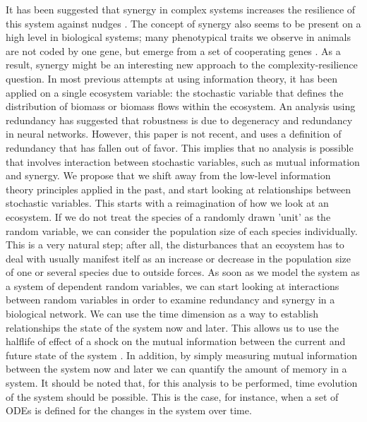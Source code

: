 \documentclass[../main.tex]{subfiles}
\begin{document}
It has been suggested that synergy in complex systems increases the resilience of this system against nudges \cite{quax2017quantifying}.
The concept of synergy also seems to be present on a high level in biological systems; many phenotypical traits we observe in animals are not coded by one gene, but emerge from a set of cooperating genes \cite{griffith2014quantifying}.
As a result, synergy might be an interesting new approach to the complexity-resilience question.
In most previous attempts at using information theory, it has been applied on a single ecosystem variable: the stochastic variable that defines the distribution of biomass or biomass flows within the ecosystem.
An analysis using redundancy has suggested that robustness is due to degeneracy and redundancy in neural networks.
However, this paper is not recent, and uses a definition of redundancy that has fallen out of favor.
This implies that no analysis is possible that involves interaction between stochastic variables, such as mutual information and synergy.
We propose that we shift away from the low-level information theory principles applied in the past, and start looking at relationships between stochastic variables.
This starts with a reimagination of how we look at an ecosystem.
If we do not treat the species of a randomly drawn 'unit' as the random variable, we can consider the population size of each species individually.
This is a very natural step; after all, the disturbances that an ecoystem has to deal with usually manifest itelf as an increase or decrease in the population size of one or several species due to outside forces.
As soon as we model the system as a system of dependent random variables, we can start looking at interactions between random variables in order to examine redundancy and synergy in a biological network.
We can use the time dimension as a way to establish relationships the state of the system now and later.
This allows us to use the halflife of effect of a shock on the mutual information between the current and future state of the system \cite{QuaxPersonal}.
In addition, by simply measuring mutual information between the system now and later we can quantify the amount of memory in a system.
It should be noted that, for this analysis to be performed, time evolution of the system should be possible.
This is the case, for instance, when a set of ODEs is defined for the changes in the system over time.
\end{document}
